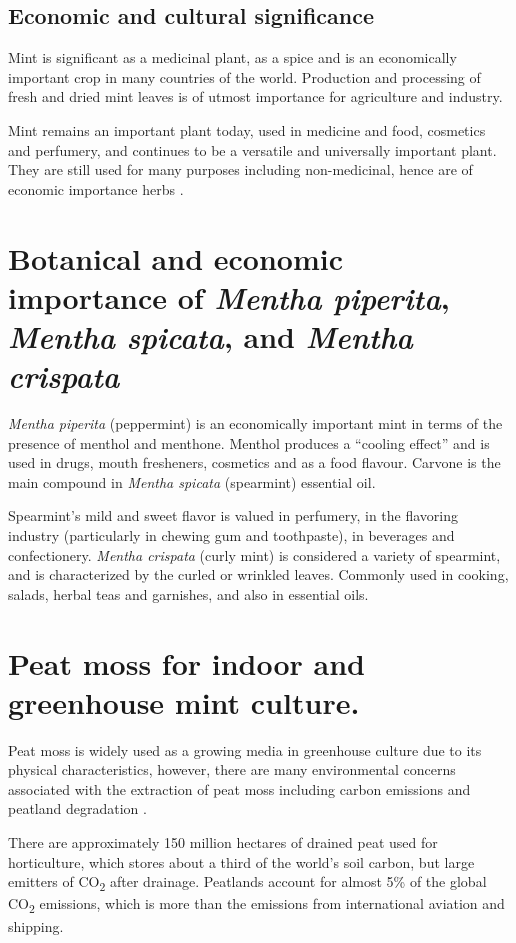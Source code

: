 \subsection{Economic and cultural significance}

Mint is significant as a medicinal plant, as a spice and is an economically important crop in many countries of the world. Production and processing of fresh and dried mint leaves is of utmost importance for agriculture and industry.

Mint remains an important plant today, used in medicine and food, cosmetics and perfumery, and continues to be a versatile and universally important plant. They are still used for many purposes including non-medicinal, hence are of economic importance herbs \parencite{Silva2020}.

\section{Botanical and economic importance of \textit{Mentha piperita}, 
\textit{Mentha spicata}, and \textit{Mentha crispata}}

\textit{Mentha piperita} (peppermint) is an economically important mint in terms of the presence of menthol and menthone. Menthol produces a ``cooling effect'' and is used in drugs, mouth fresheners, cosmetics and as a food flavour. Carvone is the main compound in \textit{Mentha spicata} (spearmint) essential oil.

Spearmint's mild and sweet flavor is valued in perfumery, in the flavoring industry (particularly in chewing gum and toothpaste), in beverages and confectionery. \textit{Mentha crispata} (curly mint) is considered a variety of spearmint, and is characterized by the curled or wrinkled leaves. Commonly used in cooking, salads, herbal teas and garnishes, and also in essential oils.

\section{Peat moss for indoor and greenhouse mint culture.}

Peat moss is widely used as a growing media in greenhouse culture due to its physical characteristics, however, there are many environmental concerns associated with the extraction of peat moss including carbon emissions and peatland degradation \parencite{Cleary2021}.

There are approximately 150 million hectares of drained peat used for horticulture, which stores about a third of the world's soil carbon, but large emitters of CO\textsubscript{2} after drainage. Peatlands account for almost 5\% of the global CO\textsubscript{2} emissions, which is more than the emissions from international aviation and shipping.

